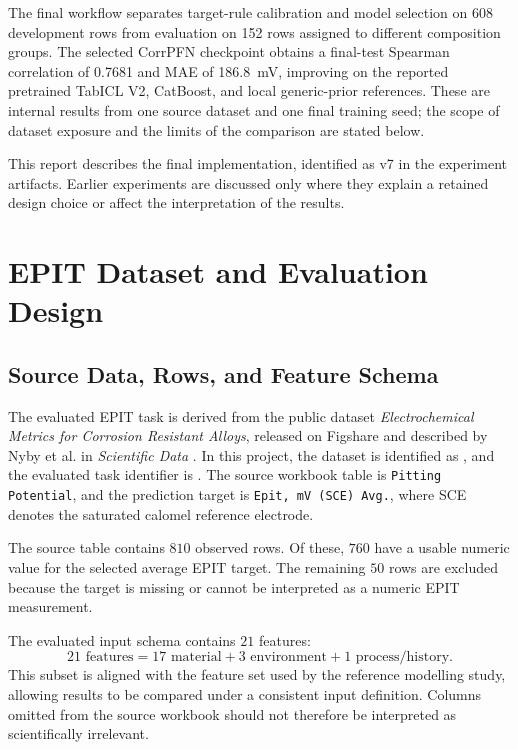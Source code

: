 \documentclass{article}
\begin{document}
The final workflow separates target-rule calibration and model selection on
608 development rows from evaluation on 152 rows assigned to different
composition groups. The selected CorrPFN checkpoint obtains a final-test
Spearman correlation of 0.7681 and MAE of 186.8~mV, improving on the reported
pretrained TabICL V2, CatBoost, and local generic-prior references. These are
internal results from one source dataset and one final training seed; the
scope of dataset exposure and the limits of the comparison are stated below.

This report describes the final implementation, identified as v7 in the
experiment artifacts. Earlier experiments are discussed only where they
explain a retained design choice or affect the interpretation of the results.

\section{EPIT Dataset and Evaluation Design}
\label{sec:epit-dataset}

\subsection{Source Data, Rows, and Feature Schema}

The evaluated EPIT task is derived from the public dataset
\textit{Electrochemical Metrics for Corrosion Resistant Alloys}, released on
Figshare and described by Nyby et al. in \textit{Scientific Data}
\cite{nyby2021electrochemical}. In this project, the dataset is identified as
, and the evaluated task identifier is
.
The source workbook table is \texttt{Pitting Potential}, and the prediction
target is \texttt{Epit, mV (SCE) Avg.}, where SCE denotes the saturated calomel
reference electrode.

The source table contains \(810\) observed rows. Of these, \(760\) have a
usable numeric value for the selected average EPIT target. The remaining
\(50\) rows are excluded because the target is missing or cannot be
interpreted as a numeric EPIT measurement.

The evaluated input schema contains \(21\) features:
\begin{equation}
21\text{ features}
=17\text{ material}+3\text{ environment}+1\text{ process/history}.
\label{eq:epit-schema}
\end{equation}
This subset is aligned with the feature set used by the reference modelling
study, allowing results to be compared under a consistent input definition.
Columns omitted from the source workbook should not therefore be interpreted
as scientifically irrelevant.
\end{document}
